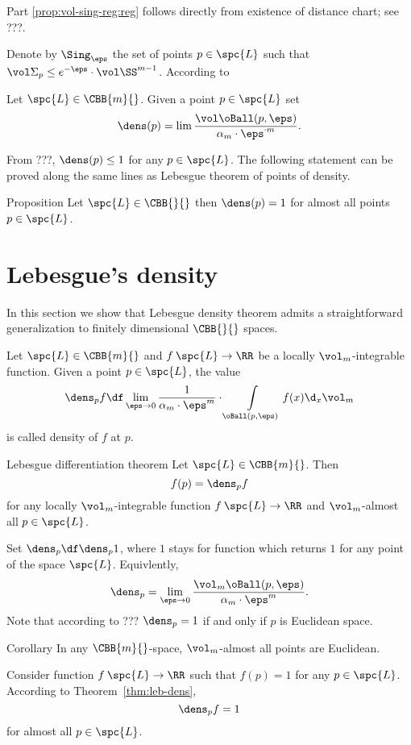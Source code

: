 Part \ref{prop:vol-sing-reg:reg} follows directly from existence of distance chart; see ???.

Denote by $\Sing_\eps$ the set of points $p\in\spc{L}$ such that $\vol\Sigma_p\le e^{-\eps}\cdot\vol\SS^{m-1}$.
According to 


Let $\spc{L}\in \CBB{m}{}$.
Given a point $p\in \spc{L}$ set 
$$\dens(p)=\lim \frac{\vol\oBall(p,\eps)}{\alpha_m\cdot\eps^{\cdot m}}.$$

From ???, $\dens(p)\le 1$ for any $p\in\spc{L}$.
The following statement can be proved along the same lines as Lebesgue theorem of points of density.

\begin{thm}{Proposition}
Let $\spc{L}\in\CBB{}{}$ then
$\dens(p)=1$
for almost all points $p\in \spc{L}$.
\end{thm}


\section{Lebesgue's density}

In this section we show that Lebesgue density theorem
admits a straightforward generalization 
to finitely dimensional $\CBB{}{}$ spaces. 

Let $\spc{L}\in \CBB{m}{}$ and $f\:\spc{L}\to\RR$ be a locally $\vol_m$-integrable function.
Given a point $p\in\spc{L}$,
the value 
$$\dens_pf\df\lim_{\eps\to 0}\frac{1}{\alpha_m\cdot\eps^m}\cdot\int\limits_{\oBall(p,\eps)}f(x)\d_x\vol_m$$
is called density of $f$ at $p$.


\begin{thm}{Lebesgue differentiation theorem}\label{thm:leb-dens}
Let $\spc{L}\in \CBB{m}{}$.
Then 
$$ f(p)=\dens_pf$$
for any locally $\vol_m$-integrable function $f\:\spc{L}\to\RR$
and $\vol_m$-almost all $p\in\spc{L}$.
\end{thm}

Set $\dens_p\df\dens_p1$, where $1$ stays for function which returns $1$ for any point of the space $\spc{L}$.
Equivlently,
$$\dens_p=\lim_{\eps\to 0}\frac{\vol_m\oBall(p,\eps)}{\alpha_m\cdot\eps^m}.$$
Note that according to ???
$\dens_p=1$ if and only if $p$ is Euclidean space.


\begin{thm}{Corollary}
In any $\CBB{m}{}$-space, $\vol_m$-almost all points are Euclidean.
\end{thm}

Consider function $f\:\spc{L}\to \RR$ 
such that $f(p)= 1$ for any $p\in\spc{L}$.
According to Theorem~\ref{thm:leb-dens},
$$\dens_pf=1$$
for almost all $p\in\spc{L}$.
\qeds

























